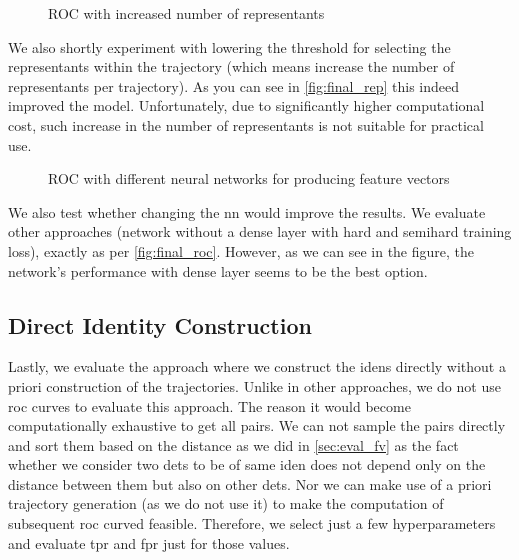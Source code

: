 \begin{figure}
    \centering
    \def\svgwidth{\columnwidth}
    {}
    \caption{ROC with increased number of representants}
    \label{fig:final_rep}
\end{figure}

We also shortly experiment with lowering the threshold for selecting the representants within the trajectory (which means increase the number of representants per trajectory). As you can see in \autoref{fig:final_rep} this indeed improved the model. Unfortunately, due to significantly higher computational cost, such increase in the number of representants is not suitable for practical use.

\begin{figure}
    \centering
    \def\svgwidth{\columnwidth}
    {}
    \caption{ROC with different neural networks for producing feature vectors}
    \label{fig:final_nn}
\end{figure}

We also test whether changing the \gls{nn} would improve the results. We evaluate other approaches (network without a dense layer with hard and semihard training loss), exactly as per \autoref{fig:final_roc}. However, as we can see in the figure, the network's performance with dense layer seems to be the best option.

\subsection{Direct Identity Construction}

Lastly, we evaluate the approach where we construct the \glspl{iden} directly without a priori construction of the trajectories. Unlike in other approaches, we do not use \gls{roc} curves to evaluate this approach. The reason it would become computationally exhaustive to get all pairs. We can not sample the pairs directly and sort them based on the distance as we did in \autoref{sec:eval_fv} as the fact whether we consider two \glspl{det} to be of same \gls{iden} does not depend only on the distance between them but also on other \glspl{det}. Nor we can make use of a priori trajectory generation (as we do not use it) to make the computation of subsequent \gls{roc} curved feasible. Therefore, we select just a few hyperparameters and evaluate \gls{tpr} and \gls{fpr} just for those values.

